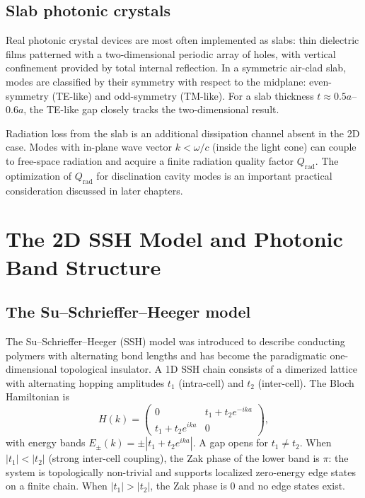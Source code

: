 \documentclass[12pt,a4paper,oneside]{book}
\theoremstyle{plain}
\theoremstyle{definition}
\theoremstyle{remark}
\newcommand{\om}{\omega}
\begin{document}
\section{Slab photonic crystals}
\label{sec:slabs}

Real photonic crystal devices are most often implemented as slabs: thin dielectric films patterned with a two-dimensional periodic array of holes, with vertical confinement provided by total internal reflection. In a symmetric air-clad slab, modes are classified by their symmetry with respect to the midplane: even-symmetry (TE-like) and odd-symmetry (TM-like). For a slab thickness $t \approx 0.5a$--$0.6a$, the TE-like gap closely tracks the two-dimensional result.

Radiation loss from the slab is an additional dissipation channel absent in the 2D case. Modes with in-plane wave vector $k < \om/c$ (inside the light cone) can couple to free-space radiation and acquire a finite radiation quality factor $Q_\mathrm{rad}$. The optimization of $Q_\mathrm{rad}$ for disclination cavity modes is an important practical consideration discussed in later chapters.

\chapter{The 2D SSH Model and Photonic Band Structure}
\label{chap:ssh-analogy}

\section{The Su--Schrieffer--Heeger model}
\label{sec:ssh-1d}

The Su--Schrieffer--Heeger (SSH) model was introduced to describe conducting polymers with alternating bond lengths and has become the paradigmatic one-dimensional topological insulator. A 1D SSH chain consists of a dimerized lattice with alternating hopping amplitudes $t_1$ (intra-cell) and $t_2$ (inter-cell). The Bloch Hamiltonian is
\begin{equation}
  H(k) = \begin{pmatrix} 0 & t_1 + t_2 e^{-ika} \\ t_1 + t_2 e^{ika} & 0 \end{pmatrix},
  \label{eq:ssh-1d}
\end{equation}
with energy bands $E_\pm(k) = \pm|t_1 + t_2 e^{ika}|$. A gap opens for $t_1 \neq t_2$. When $|t_1| < |t_2|$ (strong inter-cell coupling), the Zak phase of the lower band is $\pi$: the system is topologically non-trivial and supports localized zero-energy edge states on a finite chain. When $|t_1| > |t_2|$, the Zak phase is $0$ and no edge states exist.
\end{document}
